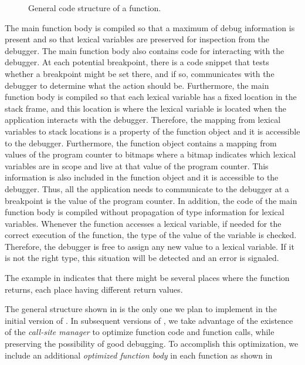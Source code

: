 \begin{figure}
\begin{center}
\end{center}
\caption{\label{fig-function-code-structure}
General code structure of a function.}
\end{figure}

The main function body is compiled so that a maximum of debug
information is present and so that lexical variables are preserved for
inspection from the debugger.  The main function body also contains
code for interacting with the debugger.  At each potential breakpoint,
there is a code snippet that tests whether a breakpoint might be set
there, and if so, communicates with the debugger to determine what the
action should be.  Furthermore, the main function body is compiled so
that each lexical variable has a fixed location in the stack frame,
and this location is where the lexical variable is located when the
application interacts with the debugger.  Therefore, the mapping from
lexical variables to stack locations is a property of the function
object and it is accessible to the debugger.  Furthermore, the
function object contains a mapping from values of the program counter
to bitmaps where a bitmap indicates which lexical variables are in
scope and live at that value of the program counter.  This information
is also included in the function object and it is accessible to the
debugger.  Thus, all the application needs to communicate to the
debugger at a breakpoint is the value of the program counter.  In
addition, the code of the main function body is compiled without
propagation of type information for lexical variables.  Whenever the
function accesses a lexical variable, if needed for the correct
execution of the function, the type of the value of the variable is
checked.  Therefore, the debugger is free to assign any new value to a
lexical variable.  If it is not the right type, this situation will be
detected and an error is signaled.

The example in  indicates that
there might be several places where the function returns, each place
having different return values.

The general structure shown in  is
the only one we plan to implement in the initial version of
\sysname{}.  In subsequent versions of \sysname{}, we take advantage
of the existence of the \emph{call-site manager} to optimize function
code and function calls, while preserving the possibility of good
debugging.  To accomplish this optimization, we include an additional
\emph{optimized function body} in each function as shown in 

